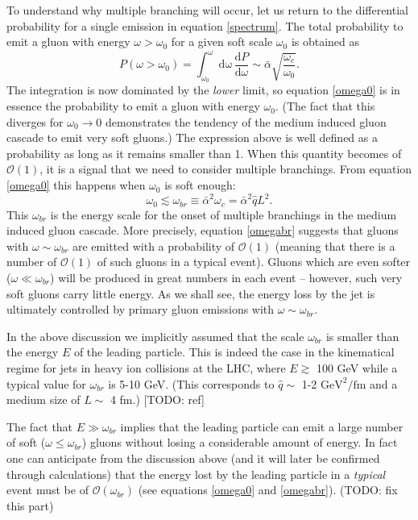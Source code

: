 \documentclass[a4paper,12pt]{article}
\numberwithin{equation}{section}
\begin{document}
To understand why multiple branching will occur, let us return to the differential probability for a single emission in equation \eqref{spectrum}. The total probability to emit a gluon with energy $\omega>\omega_0$ for a given soft scale $\omega_0$ is obtained as
\begin{equation}\label{omega0}
P(\omega>\omega_0)=\int_{\omega_0}^\omega \mathrm{d\omega}\, \frac{\mathrm{d}P}{\mathrm{d}\omega} \sim \bar{\alpha}\sqrt{\frac{\omega_c}{\omega_0}}.
\end{equation}
The integration is now dominated by the \emph{lower} limit, so equation \eqref{omega0} is in essence the probability to emit a gluon with energy $\omega_0$. (The fact that this diverges for $\omega_0 \rightarrow 0$ demonstrates the tendency of the medium induced gluon cascade to emit very soft gluons.) The expression above is well defined as a probability as long as it remains smaller than 1. When this quantity becomes of $\mathcal{O}(1)$, it is a signal that we need to consider multiple branchings. From equation \eqref{omega0} this happens when $\omega_0$ is soft enough: 
\begin{equation}\label{omegabr}
\omega_0 \lesssim \omega_{br} \equiv \bar{\alpha}^2\omega_c=\bar{\alpha}^2 \hat{q} L^2.
\end{equation}
This $\omega_{br}$ is the energy scale for the onset of multiple branchings in the medium induced gluon cascade. More precisely, equation \eqref{omegabr} suggests that gluons with $\omega \sim \omega_{br}$ are emitted with a probability of $\mathcal{O}(1)$ (meaning that there is a number of $\mathcal{O}(1)$ of such gluons in a typical event). Gluons which are even softer ($\omega \ll \omega_{br}$) will be produced in great numbers in each event -- however, such very soft gluons carry little energy. As we shall see, the energy loss by the jet is ultimately controlled by primary gluon emissions with $\omega \sim \omega_{br}$.



In the above discussion we implicitly assumed that the scale $\omega_{br}$ is smaller than the energy $E$ of the leading particle. This is indeed the case in the kinematical regime for jets in heavy ion collisions at the LHC, where $E\gtrsim $ 100 GeV while a typical value for $\omega_{br}$ is 5-10 GeV. (This corresponds to $\hat{q} \sim$ 1-2 $\text{GeV}^2/\text{fm}$ and a medium size of $L\sim$ 4 fm.)
[TODO: ref]

The fact that $E\gg \omega_{br}$ implies that the leading particle can emit a large number of soft ($\omega \leq \omega_{br}$) gluons without losing a considerable amount of energy. In fact one can anticipate from the discussion above (and it will later be confirmed through calculations) that the energy lost by the leading particle in a \emph{typical} event must be of $\mathcal{O}(\omega_{br})$ (see equations \eqref{omega0} and \eqref{omegabr}). (TODO: fix this part)
\end{document}
